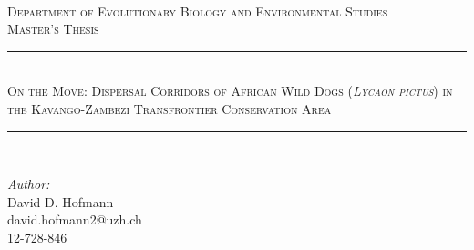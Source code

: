 \documentclass[abstract=on,10pt,a4paper,bibliography=totocnumbered]{scrartcl}
\begin{document}


\begin{titlepage}

\newcommand{\HRule}{\rule{\linewidth}{0.5mm}}

\center


\textsc{\LARGE  }\\[1.5cm]

\textsc{\Large Department of Evolutionary Biology and Environmental
Studies}\\[0.5cm]

\textsc{\large Master's Thesis}\\[0.5cm]

\doublespacing
\HRule \\[0.4cm]

{\textsc{ \LARGE On the Move: Dispersal Corridors of African Wild Dogs
(\textit{Lycaon pictus}) in the Kavango-Zambezi Transfrontier Conservation
Area}}\\[0.4cm]

\HRule \\[1.5cm]
\singlespacing


\begin{minipage}{0.4\textwidth}
\begin{flushleft} \large

\emph{Author:}\\
David D. Hofmann\\
david.hofmann2@uzh.ch\\
12-728-846

\end{flushleft}
\end{minipage}
~
\begin{minipage}{0.4\textwidth}
\begin{flushright} \large


\end{flushright}
\end{minipage}
\end{titlepage}
\end{document}
